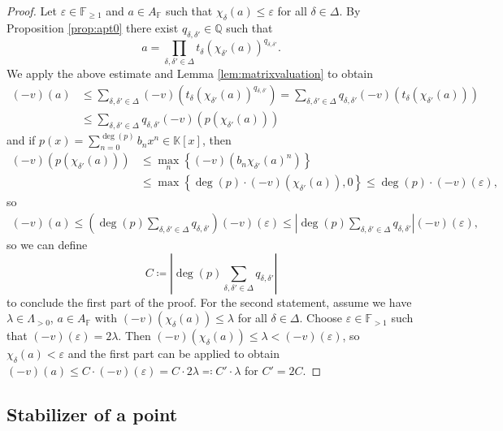 \documentclass[12pt]{amsart}
\newcommand{\F}{\mathbb{F} }
\newcommand{\Q}{\mathbb{Q} }
\newcommand{\K}{\mathbb{K}}
\numberwithin{equation}{section}
\theoremstyle{remark} %
\begin{document}
\begin{proof}
	Let $\varepsilon \in \F_{\geq 1}$ and $a\in A_\F$ such that $\chi_\delta(a) \leq \varepsilon $ for all $\delta \in \Delta$. By Proposition \ref{prop:apt0} there exist $q_{\delta,\delta'} \in \Q$ such that
	$$
	a = \prod_{\delta,\delta' \in \Delta} t_\delta(\chi_{\delta'}(a))^{q_{\delta,\delta'}}.
	$$ 
	We apply the above estimate and Lemma \ref{lem:matrixvaluation} to obtain
	\begin{align*}
		(-v)\left( a \right) & \leq \sum_{\delta,\delta'\in \Delta} (-v)\left(  t_\delta (\chi_{\delta'}(a))^{q_{\delta,\delta'}}  \right)
		= \sum_{\delta,\delta'\in \Delta} q_{\delta,\delta'} (-v)\left(  t_\delta (\chi_{\delta'}(a))\right) \\
		&\leq  \sum_{\delta,\delta'\in \Delta} q_{\delta,\delta'} (-v)\left(  p (\chi_{\delta'}(a))\right)
	\end{align*}
and if $p(x) = \sum_{n=0}^{\deg(p)} b_n x^n \in \K[x]$, then
\begin{align*}
	(-v)(p(\chi_{\delta'}(a))) & \leq \max_{n} \left\{ (-v)\left( b_n \chi_{\delta'}(a)^n\right) \right\} 
	\\
	&\leq \max \left\{ \deg(p) \cdot (-v)(\chi_{\delta'}(a)) , 0 \right\} \leq  \deg(p) \cdot (-v)(\varepsilon) ,
\end{align*}
so
\begin{align*}
	(-v)(a) \leq \left( \deg(p)\sum_{\delta,\delta'\in\Delta} q_{\delta,\delta'}  \right) (-v)(\varepsilon)
	\leq   \left\lvert \deg(p)\sum_{\delta,\delta'\in\Delta} q_{\delta,\delta'}  \right\rvert (-v)(\varepsilon),
\end{align*}
so we can define
$$
C \coloneqq \left\lvert \deg(p)\sum_{\delta,\delta'\in\Delta} q_{\delta,\delta'} \right\rvert 
$$
to conclude the first part of the proof. For the second statement, assume we have $\lambda \in \Lambda_{>0}$, $a\in A_\F$ with $(-v)(\chi_\delta(a))\leq \lambda$ for all $\delta \in \Delta$. Choose $\varepsilon \in \F_{>1}$ such that $(-v)(\varepsilon) = 2\lambda$. Then $(-v)(\chi_\delta(a))\leq \lambda < (-v)(\varepsilon)$, so $\chi_\delta(a) < \varepsilon$ and the first part can be applied to obtain $(-v)(a) \leq C \cdot (-v)(\varepsilon) = C \cdot 2\lambda \eqcolon C' \cdot \lambda$ for $C' = 2C$.
\end{proof}




\subsection{Stabilizer of a point} \label{sec:stabilizer}
\end{document}

